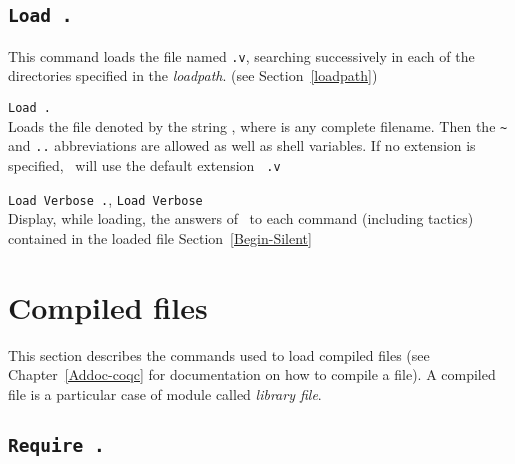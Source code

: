 \subsection[\tt Load {\ident}.]{\tt Load {\ident}.\label{Load}}
This command loads the file named {\ident}{\tt .v}, searching
successively in each of the directories specified in the {\em
  loadpath}. (see Section~\ref{loadpath})

\begin{Variants}
\item {\tt Load {\str}.}\label{Load-str}\\
  Loads the file denoted by the string {\str}, where {\str} is any
  complete filename. Then the \verb.~. and {\tt ..}
  abbreviations are allowed as well as shell variables. If no
  extension is specified, \Coq\ will use the default extension {\tt
    .v}
\item {\tt Load Verbose {\ident}.},
  {\tt Load Verbose {\str}}\\
  Display, while loading, the answers of \Coq\ to each command
  (including tactics) contained in the loaded file
  \SeeAlso Section~\ref{Begin-Silent}
\end{Variants}

\begin{ErrMsgs}
\item {}
\end{ErrMsgs}

\section[Compiled files]{Compiled files\label{compiled}}

This section describes the commands used to load compiled files (see
Chapter~\ref{Addoc-coqc} for documentation on how to compile a file).
A compiled file is a particular case of module called {\em library file}.


\subsection[\tt Require {\qualid}.]{\tt Require {\qualid}.\label{Require}
}

